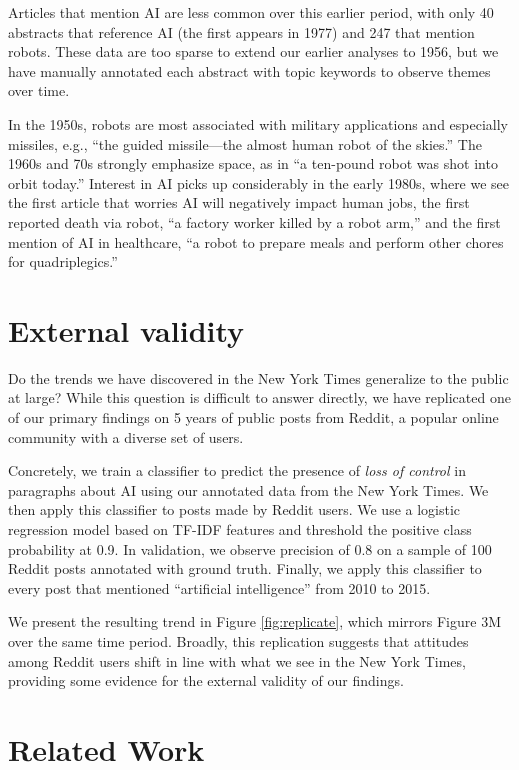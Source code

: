 \documentclass[letterpaper]{article}
\begin{document}
Articles that mention AI are less common over this earlier period, with only 40 abstracts that reference AI (the first appears in 1977) and 247 that mention robots. These data are too sparse to extend our earlier analyses to 1956, but we have manually annotated each abstract with topic keywords to observe themes over time.  

In the 1950s, robots are most associated with military applications and especially missiles, e.g., ``the guided missile---the almost human robot of the skies.'' The 1960s and 70s strongly emphasize space, as in ``a ten-pound robot was shot into orbit today.'' Interest in AI picks up considerably in the early 1980s, where we see the first article that worries AI will negatively impact human jobs, the first reported death via robot, ``a factory worker killed by a robot arm,'' and the first mention of AI in healthcare, ``a robot to prepare meals and perform other chores for quadriplegics.''

\section{External validity}

Do the trends we have discovered in the New York Times generalize to the public at large? While this question is difficult to answer directly, we have replicated one of our primary findings on 5 years of public posts from Reddit, a popular online community with a diverse set of users. 

Concretely, we train a classifier to predict the presence of \textit{loss of control} in paragraphs about AI using our annotated data from the New York Times. We then apply this classifier to posts made by Reddit users. We use a logistic regression model based on TF-IDF features and threshold the positive class probability at 0.9. In validation, we observe precision of 0.8 on a sample of 100 Reddit posts annotated with ground truth. Finally, we apply this classifier to every post that mentioned ``artificial intelligence'' from 2010 to 2015.

We present the resulting trend in Figure \ref{fig:replicate}, which mirrors Figure 3M over the same time period. Broadly, this replication suggests that attitudes among Reddit users shift in line with what we see in the New York Times, providing some evidence for the external validity of our findings.

\section{Related Work}
\end{document}

